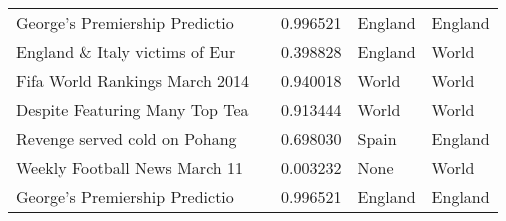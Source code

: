\begin{table}[h]
\begin{tabular}{l|l|l|l|l}
George's Premiership Predictio  &        & 0.996521 & England & England  \\
England \& Italy victims of Eur &        & 0.398828 & England & World    \\
Fifa World Rankings March 2014  &        & 0.940018 & World   & World    \\
Despite Featuring Many Top Tea  &        & 0.913444 & World   & World    \\
Revenge served cold on Pohang   &        & 0.698030 & Spain   & England  \\
Weekly Football News March 11   &        & 0.003232 & None    & World    \\
George's Premiership Predictio  &        & 0.996521 & England & England \\ \hline
\end{tabular}
\end{table}




